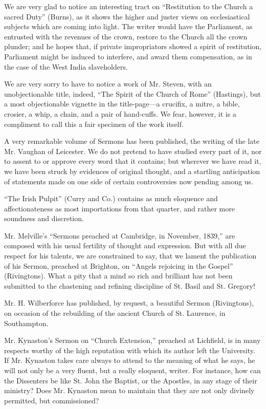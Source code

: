 We are very glad to notice an interesting tract on ``Restitution to the Church a sacred Duty'' (Burns), as it shows the
higher and juster views on ecclesiastical subjects which are coming into
light. The writer would have the Parliament, as entrusted with the
revenues of the crown, restore to the Church all the crown plunder; and
he hopes that, if private impropriators showed a spirit of
restitution, Parliament might be induced to interfere, and award them
compensation, as in the case of the West India slaveholders.

We are very sorry to have to notice a work of Mr.
Steven, with an unobjectionable title, indeed, ``The Spirit of the
Church of Rome'' (Hastings), but a most objectionable vignette in the
title-page—a crucifix, a mitre, a bible, crosier, a whip, a chain, and
a pair of hand-cuffs. We fear, however, it is a compliment to call this
a fair specimen of the work itself.

A very remarkable volume of Sermons has been
published, the writing of the late Mr. Vaughan of Leicester. We do not
pretend to have studied every part of it, nor to assent to or approve
every word that it contains; but wherever we have read it, we have been
struck by evidences of original thought, and a startling anticipation of
statements made on one side of certain controversies now pending among
us.

``The Irish Pulpit'' (Curry and Co.) contains as
much eloquence and affectionateness as most importations from that
quarter, and rather more soundness and discretion.

Mr. Melville's ``Sermons preached at Cambridge,
in November, 1839,'' are composed with his usual fertility of thought
and expression. But with all due respect for his talents, we are
constrained to say, that we lament the publication of his Sermon,
preached at Brighton, on ``Angels rejoicing in the Gospel'' (Rivingtons).
What a pity that a mind so rich and brilliant has not been submitted to
the chastening and refining discipline of St. Basil and St. Gregory!

Mr. H. Wilberforce has published, by request, a
beautiful Sermon (Rivingtons), on occasion of the rebuilding of the
ancient Church of St. Laurence, in Southampton.

Mr. Kynaston's Sermon on ``Church Extension,''
preached at Lichfield, is in many respects worthy of the high reputation
with which its author left the University. If Mr. Kynaston takes care
always to attend to the meaning of what he says, he will not only be a
very fluent, but a really eloquent, writer. For instance, how can the
Dissenters be like St. John the Baptist, or the Apostles, in any stage
of their ministry? Does Mr. Kynaston mean to maintain that they are not
only divinely permitted, but commissioned?

